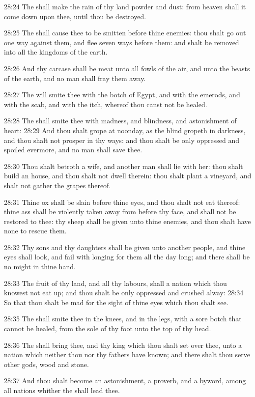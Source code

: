28:24 The \LORD shall make the rain of thy land powder and dust: from
heaven shall it come down upon thee, until thou be destroyed.

28:25 The \LORD shall cause thee to be smitten before thine enemies:
thou shalt go out one way against them, and flee seven ways before
them: and shalt be removed into all the kingdoms of the earth.

28:26 And thy carcase shall be meat unto all fowls of the air, and
unto the beasts of the earth, and no man shall fray them away.

28:27 The \LORD will smite thee with the botch of Egypt, and with the
emerods, and with the scab, and with the itch, whereof thou canst not
be healed.

28:28 The \LORD shall smite thee with madness, and blindness, and
astonishment of heart: 28:29 And thou shalt grope at noonday, as the
blind gropeth in darkness, and thou shalt not prosper in thy ways: and
thou shalt be only oppressed and spoiled evermore, and no man shall
save thee.

28:30 Thou shalt betroth a wife, and another man shall lie with her:
thou shalt build an house, and thou shalt not dwell therein: thou
shalt plant a vineyard, and shalt not gather the grapes thereof.

28:31 Thine ox shall be slain before thine eyes, and thou shalt not
eat thereof: thine ass shall be violently taken away from before thy
face, and shall not be restored to thee: thy sheep shall be given unto
thine enemies, and thou shalt have none to rescue them.

28:32 Thy sons and thy daughters shall be given unto another people,
and thine eyes shall look, and fail with longing for them all the day
long; and there shall be no might in thine hand.

28:33 The fruit of thy land, and all thy labours, shall a nation which
thou knowest not eat up; and thou shalt be only oppressed and crushed
alway: 28:34 So that thou shalt be mad for the sight of thine eyes
which thou shalt see.

28:35 The \LORD shall smite thee in the knees, and in the legs, with a
sore botch that cannot be healed, from the sole of thy foot unto the
top of thy head.

28:36 The \LORD shall bring thee, and thy king which thou shalt set
over thee, unto a nation which neither thou nor thy fathers have
known; and there shalt thou serve other gods, wood and stone.

28:37 And thou shalt become an astonishment, a proverb, and a byword,
among all nations whither the \LORD shall lead thee.

